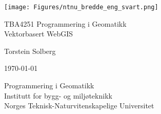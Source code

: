 \thispagestyle{empty}
\texttt{[image: Figures/ntnu\_bredde\_eng\_svart.png]}
\vspace{12pc}

\Huge{TBA4251 Programmering i Geomatikk \\ Vektorbasert WebGIS}
\vspace{18pc}

\Large{Torstein Solberg}

\large{\monthyeardate\today}

Programmering i Geomatikk\\
Institutt for bygg- og miljøteknikk\\
Norges Teknisk-Naturvitenskapelige Universitet







